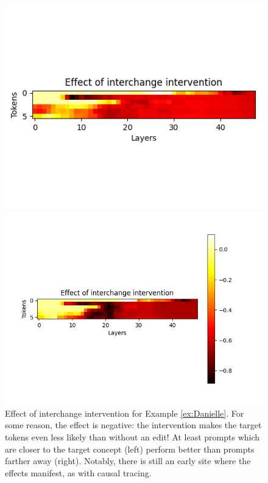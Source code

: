 \documentclass{article}
\begin{document}
  \begin{figure}[h]
    \centering
    \begin{minipage}{0.43\textwidth}
        \centering
        \includegraphics[width=\textwidth]{figures/countereffective_table_0.png}
    \end{minipage}\hfill
    \begin{minipage}{0.57\textwidth}
        \centering
        \includegraphics[width=\textwidth]{figures/table_0.png}
    \end{minipage}
    \caption{Effect of interchange intervention for Example \ref{ex:Danielle}. For some reason, the effect is negative: the intervention makes the target tokens even less likely than without an edit! At least prompts which are closer to the target concept (left) perform better than prompts farther away (right). Notably, there is still an early site where the effects manifest, as with causal tracing.}
\end{figure}
\end{document}
